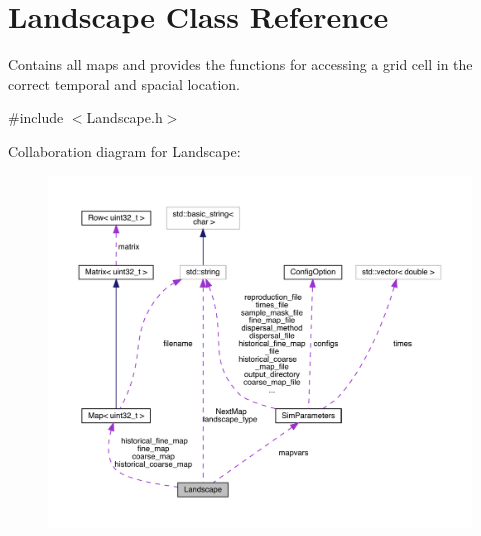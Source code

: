 \hypertarget{class_landscape}{}\section{Landscape Class Reference}
\label{class_landscape}


Contains all maps and provides the functions for accessing a grid cell in the correct temporal and spacial location.  




{\ttfamily \#include $<$Landscape.\+h$>$}



Collaboration diagram for Landscape\+:\nopagebreak
\begin{figure}[H]
\begin{center}
\leavevmode
\includegraphics[width=350pt]{class_landscape__coll__graph}
\end{center}
\end{figure}
